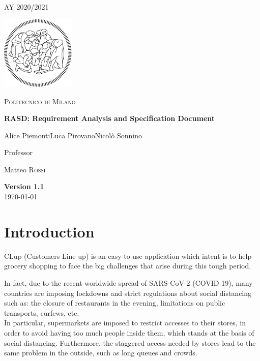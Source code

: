 \documentclass[table, 12pt]{article}
\begin{document}
\begin{titlepage}
    \centering
    {\scshape\large AY 2020/2021 \par}
    \vfill
    \includegraphics[width=100pt]{assets/logo-polimi-new}\par\vspace{1cm}
    {\scshape\LARGE Politecnico di Milano \par}
    \vspace{1.5cm}
    {\huge\bfseries RASD\@: Requirement Analysis
        and Specification Document \par}
    \vspace{2cm}
    {\Large {Alice Piemonti\quad Luca Pirovano\quad Nicolò Sonnino}\par}
    \vfill
    {\large Professor\par
        Matteo \textsc{Rossi}}
    \vfill
    {\large \textbf{Version 1.1}\\ \today \par}
\end{titlepage}
\thispagestyle{plain}
\mbox{}
\newpage
{}
\tableofcontents
\newpage
{}

\section{Introduction}
CLup (Customers Line-up) is an easy-to-use application which intent is to help grocery shopping to face the big challenges that arise during this tough period.

In fact, due to the recent worldwide spread of SARS-CoV-2 (COVID-19), many countries are imposing lockdowns and strict regulations about social distancing such as: the closure of restaurants in the evening, limitations on public transports, curfews, etc.\\

In particular, supermarkets are imposed to restrict accesses to their stores, in order to avoid having too much people inside them, which stands at the basis of social distancing. Furthermore, the staggered access needed by stores lead to the same problem in the outside, such as long queues and crowds.
\end{document}

